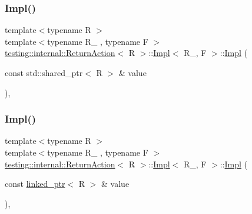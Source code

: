 \mbox{\label{classtesting_1_1internal_1_1_return_action_1_1_impl_adacdef502a597ee9f92b52f21153cab9}} 
\subsubsection{\texorpdfstring{Impl()}{Impl()}\hspace{0.1cm}{\footnotesize\ttfamily [2/3]}}
{\footnotesize\ttfamily template$<$typename R $>$ \\
template$<$typename R\+\_\+ , typename F $>$ \\
\mbox{\hyperlink{classtesting_1_1internal_1_1_return_action}{testing\+::internal\+::\+Return\+Action}}$<$ R $>$\+::\mbox{\hyperlink{classtesting_1_1internal_1_1_return_action_1_1_impl}{Impl}}$<$ R\+\_\+, F $>$\+::\mbox{\hyperlink{classtesting_1_1internal_1_1_return_action_1_1_impl}{Impl}} (\begin{DoxyParamCaption}\item[{const std\+::shared\+\_\+ptr$<$ R $>$ \&}]{value }\end{DoxyParamCaption})\hspace{0.3cm}{\ttfamily [inline]}, {\ttfamily [explicit]}}

\mbox{\label{classtesting_1_1internal_1_1_return_action_1_1_impl_afde6b8872e55f42ee105fb70b3ceccb2}} 
\subsubsection{\texorpdfstring{Impl()}{Impl()}\hspace{0.1cm}{\footnotesize\ttfamily [3/3]}}
{\footnotesize\ttfamily template$<$typename R $>$ \\
template$<$typename R\+\_\+ , typename F $>$ \\
\mbox{\hyperlink{classtesting_1_1internal_1_1_return_action}{testing\+::internal\+::\+Return\+Action}}$<$ R $>$\+::\mbox{\hyperlink{classtesting_1_1internal_1_1_return_action_1_1_impl}{Impl}}$<$ R\+\_\+, F $>$\+::\mbox{\hyperlink{classtesting_1_1internal_1_1_return_action_1_1_impl}{Impl}} (\begin{DoxyParamCaption}\item[{const \mbox{\hyperlink{classtesting_1_1internal_1_1linked__ptr}{linked\+\_\+ptr}}$<$ R $>$ \&}]{value }\end{DoxyParamCaption})\hspace{0.3cm}{\ttfamily [inline]}, {\ttfamily [explicit]}}



